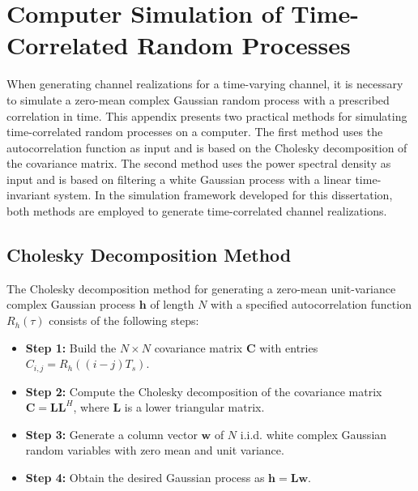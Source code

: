 \chapter[Computer Simulation of Time-Correlated Processes]{Computer Simulation of Time-Correlated Random Processes}
\label{appendix:time_correlated_processes}

When generating channel realizations for a time-varying channel, it is necessary to simulate a zero-mean complex Gaussian random process with a prescribed correlation in time.
This appendix presents two practical methods for simulating time-correlated random processes on a computer.
The first method uses the autocorrelation function as input and is based on the Cholesky decomposition of the covariance matrix.
The second method uses the power spectral density as input and is based on filtering a white Gaussian process with a linear time-invariant system.
In the simulation framework developed for this dissertation, both methods are employed to generate time-correlated channel realizations.


\section{Cholesky Decomposition Method}
\label{appendix:cholesky_method}

The Cholesky decomposition method for generating a zero-mean unit-variance complex Gaussian process $\mathbf{h}$ of length $N$ with a specified autocorrelation function $R_h(\tau)$ consists of the following steps:
\begin{itemize}[label={}, leftmargin=0.5cm]
    
    \item \textbf{Step 1:} 
    Build the $N \times N$ covariance matrix $\mathbf{C}$ with entries $C_{i,j} = R_h((i-j)T_s)$.
    
    \item \textbf{Step 2:} 
    Compute the Cholesky decomposition of the covariance matrix $\mathbf{C} = \mathbf{L}\mathbf{L}^H$, where $\mathbf{L}$ is a lower triangular matrix.
    
    \item \textbf{Step 3:} 
    Generate a column vector $\mathbf{w}$ of $N$ i.i.d. white complex Gaussian random variables with zero mean and unit variance.
    
    \item \textbf{Step 4:}
    Obtain the desired Gaussian process as $\mathbf{h} = \mathbf{L}\mathbf{w}$.

\end{itemize}

